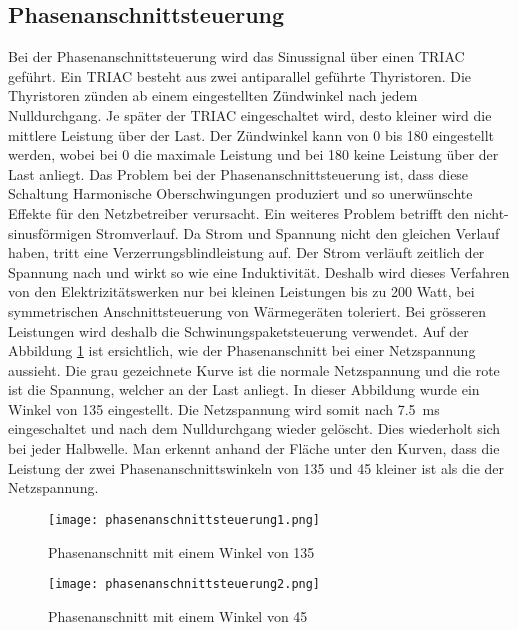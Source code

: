 \subsection{Phasenanschnittsteuerung}
Bei der Phasenanschnittsteuerung wird das Sinussignal über einen TRIAC geführt. Ein TRIAC besteht aus zwei antiparallel geführte Thyristoren. Die Thyristoren zünden ab einem eingestellten Zündwinkel nach jedem Nulldurchgang. Je später der TRIAC eingeschaltet wird, desto kleiner wird die mittlere Leistung über der Last. Der Zündwinkel kann von 0\textdegree \hspace{0.02cm} bis 180\textdegree \hspace{0.02cm} eingestellt werden, wobei bei 0\textdegree \hspace{0.02cm} die maximale Leistung und bei 180\textdegree \hspace{0.02cm} keine Leistung über der Last anliegt. Das Problem bei der Phasenanschnittsteuerung ist, dass diese Schaltung Harmonische Oberschwingungen produziert und so unerwünschte Effekte für den Netzbetreiber verursacht. Ein weiteres Problem betrifft den nicht-sinusförmigen Stromverlauf. Da Strom und Spannung nicht den gleichen Verlauf haben, tritt eine Verzerrungsblindleistung auf. Der Strom verläuft zeitlich der Spannung nach und wirkt so wie eine Induktivität. Deshalb wird dieses Verfahren von den Elektrizitätswerken nur bei kleinen Leistungen bis zu 200 Watt, bei symmetrischen Anschnittsteuerung von Wärmegeräten toleriert. Bei grösseren Leistungen wird deshalb die Schwinungspaketsteuerung verwendet. Auf der Abbildung \ref{fig:Phasenanschnitt1} ist ersichtlich, wie der Phasenanschnitt bei einer Netzspannung aussieht. Die grau gezeichnete Kurve ist die normale Netzspannung und die rote ist die Spannung, welcher an der Last anliegt. In dieser Abbildung wurde ein Winkel von 135\textdegree\hspace{0.02cm} eingestellt. Die Netzspannung wird somit nach \SI{7.5}{ms} eingeschaltet und nach dem Nulldurchgang wieder gelöscht. Dies wiederholt sich bei jeder Halbwelle. Man erkennt anhand der Fläche unter den Kurven, dass die Leistung der zwei Phasenanschnittswinkeln von 135\textdegree\hspace{0.02cm} und 45\textdegree\hspace{0.02cm} kleiner ist als die der Netzspannung. 

\begin{figure}[ht!]
	\centering
	\texttt{[image: phasenanschnittsteuerung1.png]}	
	\caption{Phasenanschnitt mit einem Winkel von 135\textdegree \cite{Phasenanschnittsteuerung}}\label{fig:Phasenanschnitt1}
\end{figure}
\newpage
\begin{figure}[ht!]
	\centering
	\texttt{[image: phasenanschnittsteuerung2.png]}	
	\caption{Phasenanschnitt mit einem Winkel von 45\textdegree \cite{Phasenanschnittsteuerung}}\label{fig:Phasenanschnitt2}
\end{figure}

